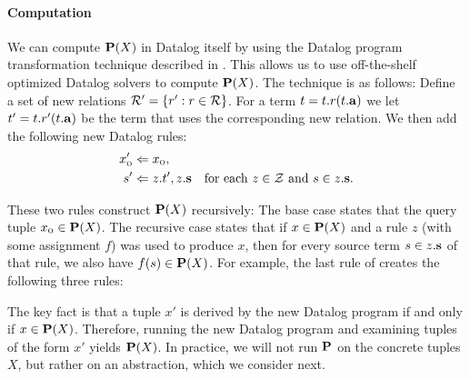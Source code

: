 \paragraph{Computation}

We can compute $\mathbf{P}(X)$ in Datalog itself by using the Datalog program transformation technique described in 
\cite{liang11minimal}.
This allows us to use off-the-shelf optimized Datalog solvers to compute $\mathbf{P}(X)$.
The technique is as follows: Define a set of new relations $\mathcal{R}' = \{ r' : r \in \mathcal{R} \}$.
For a term $t = t.r(t.\mathbf{a})$ we let $t' = t.r'(t.\mathbf{a})$ be the term that uses the corresponding new relation.
We then add the following new Datalog rules:
\begin{align}
x_\text{\sc o}' &\Leftarrow x_\text{\sc o}, \label{eqn:revBase} \\
s'   &\Leftarrow z.t', z.\mathbf{s} \quad \text{for each $z \in \mathcal{Z}$ and $s \in z.\mathbf{s}$.} \label{eqn:indBase}
\end{align}

These two rules construct $\mathbf{P}(X)$ recursively:
The base case  states that the query tuple $x_\text{\sc o} \in \mathbf{P}(X)$.
The recursive case  states that if $x \in \mathbf{P}(X)$ and a rule $z$ (with some assignment $f$)
was used to produce $x$, then for every source term $s \in z.\mathbf{s}$ of that rule,
we also have $f(s) \in \mathbf{P}(X)$.
For example, the last rule of  creates the following three rules:
\begin{center}
\end{center}

The key fact is that a tuple $x'$ is derived by the new Datalog program if and only if $x \in \mathbf{P}(X)$.
Therefore, running the new Datalog program and examining tuples of the form $x'$ yields $\mathbf{P}(X)$.
In practice, we will not run $\mathbf{P}$ on the concrete tuples $X$, but rather on an abstraction,
which we consider next.


